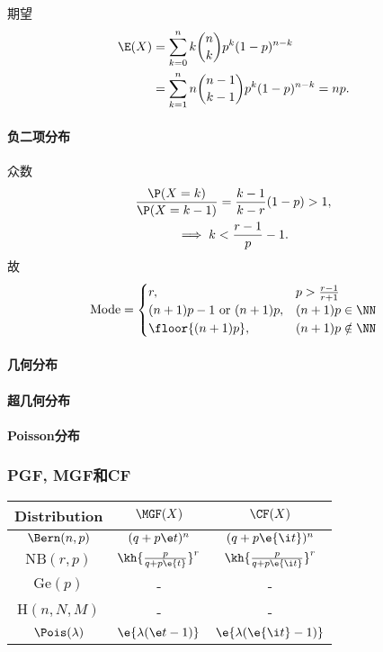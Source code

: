 期望 
\begin{align*}
	\E(X)&=\sum_{k=0}^nk{n\choose k}p^k(1-p)^{n-k}\\
	&=\sum_{k=1}^{n}n{n-1\choose k-1}p^k(1-p)^{n-k}=np.
\end{align*}
\paragraph{负二项分布}众数
\begin{gather*}
	\frac{\P(X=k)}{\P(X=k-1)}=\frac{k-1}{k-r}(1-p)>1,\\
	\implies k<\frac{r-1}{p}-1.
\end{gather*}
故
\begin{align*}
	\text{Mode}=\begin{cases}
		r,&p>\frac{r-1}{r+1}\\
		(n+1)p-1\text{~or~}(n+1)p,&(n+1)p\in\NN\\
		\floor{(n+1)p},&(n+1)p\notin\NN
	\end{cases}
\end{align*}
\paragraph{几何分布}
\paragraph{超几何分布}
\paragraph{Poisson分布}
\subsubsection{PGF, MGF和CF}
\begin{center}
	\begin{tabular}{c|c|c}
		\toprule
		Distribution&$\MGF(X)$&$\CF(X)$\\
		\midrule
		$\Bern(n,p)$&$(q+p\e t)^n$&$(q+p\e{\i t})^n$\\
		\midrule
		$\mathrm{NB}(r,p)$&$\kh{\frac p{q+p\e{t}}}^r$&$\kh{\frac p{q+p\e{\i t}}}^r$\\
		\midrule
		$\mathrm{Ge}(p)$&-&-\\
		\midrule
		$\mathrm H(n,N,M)$&-&-\\
		\midrule
		$\Pois(\lambda)$&$\e{\lambda(\e t-1)}$&$\e{\lambda(\e{\i t}-1)}$\\
		\bottomrule
	\end{tabular}
\end{center}

